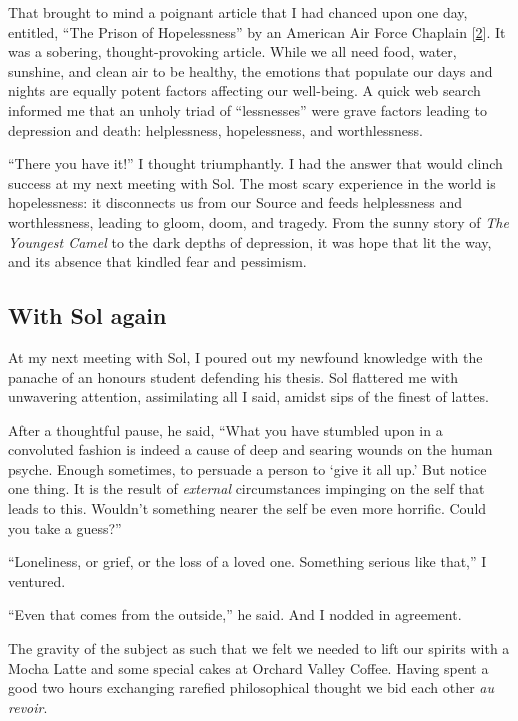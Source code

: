 \documentclass[
  a4paper,
]{article}
\begin{document}
That brought to mind a poignant article that I had chanced upon one day,
entitled, ``The Prison of Hopelessness'' by an American Air Force
Chaplain {[}\protect\hyperlink{ref-wilson2006}{2}{]}. It was a sobering,
thought-provoking article. While we all need food, water, sunshine, and
clean air to be healthy, the emotions that populate our days and nights
are equally potent factors affecting our well-being. A quick web search
informed me that an unholy triad of ``lessnesses'' were grave factors
leading to depression and death: helplessness, hopelessness, and
worthlessness.

``There you have it!'' I thought triumphantly. I had the answer that
would clinch success at my next meeting with Sol. The most scary
experience in the world is hopelessness: it disconnects us from our
Source and feeds helplessness and worthlessness, leading to gloom, doom,
and tragedy. From the sunny story of \emph{The Youngest Camel} to the
dark depths of depression, it was hope that lit the way, and its absence
that kindled fear and pessimism.

\hypertarget{with-sol-again}{%
\subsection{With Sol again}\label{with-sol-again}}

At my next meeting with Sol, I poured out my newfound knowledge with the
panache of an honours student defending his thesis. Sol flattered me
with unwavering attention, assimilating all I said, amidst sips of the
finest of lattes.

After a thoughtful pause, he said, ``What you have stumbled upon in a
convoluted fashion is indeed a cause of deep and searing wounds on the
human psyche. Enough sometimes, to persuade a person to `give it all
up.' But notice one thing. It is the result of \emph{external}
circumstances impinging on the self that leads to this. Wouldn't
something nearer the self be even more horrific. Could you take a
guess?''

``Loneliness, or grief, or the loss of a loved one. Something serious
like that,'' I ventured.

``Even that comes from the outside,'' he said. And I nodded in
agreement.

The gravity of the subject as such that we felt we needed to lift our
spirits with a Mocha Latte and some special cakes at Orchard Valley
Coffee. Having spent a good two hours exchanging rarefied philosophical
thought we bid each other \emph{au revoir}.
\end{document}

